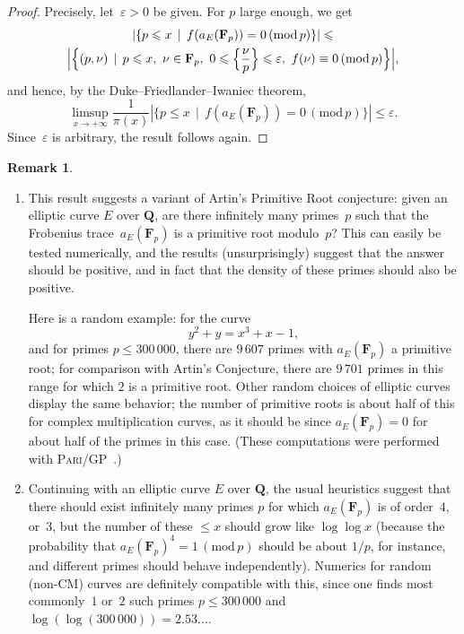 \documentclass[12pt]{amsart}
\renewcommand{\leq}{\leqslant}
\numberwithin{equation}{section}
\newcommand{\Qq}{\mathbf{Q}}
\newcommand{\Ff}{\mathbf{F}}
\newcommand{\mods}[1]{\,(\mathrm{mod}\,{#1})}
\newcommand{\eps}{\varepsilon}
\theoremstyle{plain}
\theoremstyle{remark}
\theoremstyle{definition}
\newtheorem{remark}[theorem]{Remark}
\renewcommand{\leq}{\leqslant}
\begin{document}
\begin{proof}
  Precisely, let~$\eps>0$ be given. For $p$ large enough, we get
  \begin{multline*}
    |\{p\leq x\,\mid\, f(a_E(\Ff_p))=0\mods{p}\}| \leq
    \\
    \Bigl|\Bigl\{(p,\nu)\,\mid\, p\leq x,\ \nu\in\Ff_p,\ 0\leq
    \Bigl\{\frac{\nu}{p}\Bigr\}\leq \eps,\ f(\nu)\equiv
    0\mods{p}\Bigr\}\Bigr|,
  \end{multline*}
  and hence, by the Duke--Friedlander--Iwaniec theorem, 
  \[
    \limsup_{x\to+\infty}\frac{1}{\pi(x)}|\{p\leq x\,\mid\,
    f(a_E(\Ff_p))=0\mods{p}\}| \leq \eps. 
  \]
 Since~$\eps$ is arbitrary,
  the result follows again.
\end{proof}

\begin{remark}\
\begin{enumerate}

\item This result suggests a variant of Artin's Primitive Root
  conjecture: given an elliptic curve $E$ over $\Qq$, are there infinitely many
  primes~$p$ such that the Frobenius trace~$a_E(\Ff_p)$ is a primitive root
  modulo~$p$?  This can easily be tested numerically, and the results
  (unsurprisingly) suggest that the answer should be positive, and in
  fact that the density of these primes should also be positive.
  
  Here is a random example: for the curve
  \[
    y^2+y=x^3+x-1,
  \]
  and for primes $p\leq 300\,000$, there are $9\,607$ primes with
  $a_E(\Ff_p)$ a primitive root; for comparison with Artin's Conjecture,
  there are $9\,701$ primes in this range for which $2$ is a primitive
  root. Other random choices of elliptic curves display the same behavior; the
  number of primitive roots is about half of this for complex
  multiplication curves, as it should be since $a_E(\Ff_p)=0$ for about
  half of the primes in this case. (These computations were performed
  with \textsc{Pari/GP}~\cite{parigp}.)

  \item Continuing with an elliptic curve $E$ over $\Qq$, the usual heuristics
  suggest that there should exist infinitely many primes $p$ for which
  $a_E(\Ff_p)$ is of order~$4$, or~$3$, but the number of these $\leq x$
  should grow like $\log\log x$ (because the probability that
  $a_E(\Ff_p)^4=1\mods{p}$ should be about $1/p$, for instance, and
  different primes should behave independently). Numerics for random
  (non-CM) curves are definitely compatible with this, since one finds
  most commonly~$1$ or~$2$ such primes $p\leq 300\,000$ and
  $\log(\log( 300\,000))= 2.53\ldots$.


\end{enumerate}
\end{remark}
\end{document}
